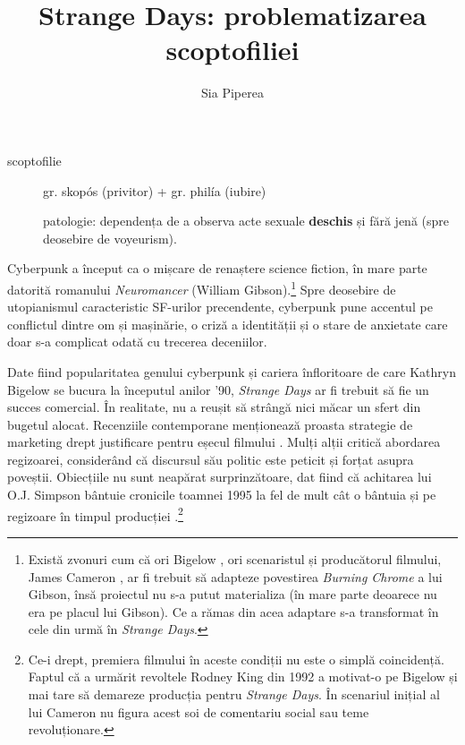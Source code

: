 \documentclass[12pt]{article}
\title{\textbf{Strange Days: problematizarea scoptofiliei}}
\author{Sia Piperea}
\date{} %
\begin{document}
	 	
\maketitle

\begin{description}
	\item[scoptofilie]\par
	gr. \dedouble skopós\sqtworight\: (privitor) + gr. \dedouble philía\sqtworight\: (iubire) \par
	patologie: dependența de a observa acte sexuale  \textbf{deschis} și fără jenă (spre deosebire de voyeurism). \par
\end{description}
		 	
Cyberpunk a început ca o mișcare de renaștere science fiction, în mare parte datorită romanului \textit{Neuromancer} (William Gibson).\footnote{Există zvonuri cum că ori Bigelow \cite{Salza1994a}, ori scenaristul și producătorul filmului, James Cameron \cite{Henry2023a}, ar fi trebuit să adapteze povestirea \textit{Burning Chrome} a lui Gibson, însă proiectul nu s-a putut materializa (în mare parte deoarece nu era pe placul lui Gibson). Ce a rămas din acea adaptare s-a transformat în cele din urmă în \textit{Strange Days}.} Spre deosebire de utopianismul caracteristic SF-urilor precendente, cyberpunk pune accentul pe conflictul dintre om și mașinărie, o criză a identității și o stare de anxietate care doar s-a complicat odată cu trecerea deceniilor.\par

Date fiind popularitatea genului cyberpunk și cariera înfloritoare de care Kathryn Bigelow se bucura la începutul anilor '90, \textit{Strange Days} ar fi trebuit să fie un succes comercial. În realitate, nu a reușit să strângă nici măcar un sfert din bugetul alocat. Recenziile contemporane menționează proasta strategie de marketing drept justificare pentru eșecul filmului \cite{McCarthy1995a}. Mulți alții critică abordarea regizoarei, considerând că discursul său politic este peticit și forțat asupra poveștii. Obiecțiile nu sunt neapărat surprinzătoare, dat fiind că achitarea lui O.J. Simpson bântuie cronicile toamnei 1995 la fel de mult cât o bântuia și pe regizoare în timpul producției \cite{Willistein1995a}.\footnote{Ce-i drept, premiera filmului în aceste condiții nu este o simplă coincidență. Faptul că a urmărit revoltele Rodney King din 1992 a motivat-o pe Bigelow și mai tare să demareze producția pentru \textit{Strange Days}. În scenariul inițial al lui Cameron nu figura acest soi de comentariu social sau teme revoluționare.}\par
\end{document}
